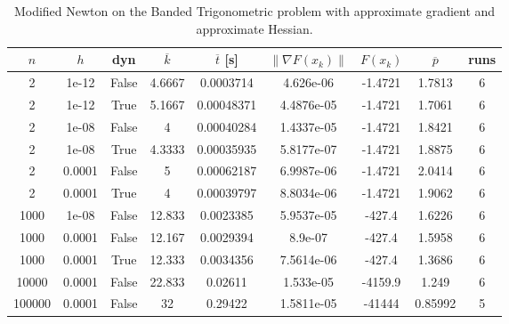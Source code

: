 \begin{table}
\caption{Modified Newton on the Banded Trigonometric problem with approximate gradient and approximate Hessian.}
\label{tab:mn_trig_all_aprox}
\begin{tabular}{ccccccccc}
\toprule
$n$ & $h$ & dyn & $\overline{k}$ & $\overline{t}$ [s] & $\|\nabla F(x_k)\|$ & $F(x_k)$ & $\overline{p}$ & runs \\
\midrule
2 & 1e-12 & False & 4.6667 & 0.0003714 & 4.626e-06 & -1.4721 & 1.7813 & 6 \\
2 & 1e-12 & True & 5.1667 & 0.00048371 & 4.4876e-05 & -1.4721 & 1.7061 & 6 \\
2 & 1e-08 & False & 4 & 0.00040284 & 1.4337e-05 & -1.4721 & 1.8421 & 6 \\
2 & 1e-08 & True & 4.3333 & 0.00035935 & 5.8177e-07 & -1.4721 & 1.8875 & 6 \\
2 & 0.0001 & False & 5 & 0.00062187 & 6.9987e-06 & -1.4721 & 2.0414 & 6 \\
2 & 0.0001 & True & 4 & 0.00039797 & 8.8034e-06 & -1.4721 & 1.9062 & 6 \\
1000 & 1e-08 & False & 12.833 & 0.0023385 & 5.9537e-05 & -427.4 & 1.6226 & 6 \\
1000 & 0.0001 & False & 12.167 & 0.0029394 & 8.9e-07 & -427.4 & 1.5958 & 6 \\
1000 & 0.0001 & True & 12.333 & 0.0034356 & 7.5614e-06 & -427.4 & 1.3686 & 6 \\
10000 & 0.0001 & False & 22.833 & 0.02611 & 1.533e-05 & -4159.9 & 1.249 & 6 \\
100000 & 0.0001 & False & 32 & 0.29422 & 1.5811e-05 & -41444 & 0.85992 & 5 \\
\bottomrule
\end{tabular}
\end{table}
